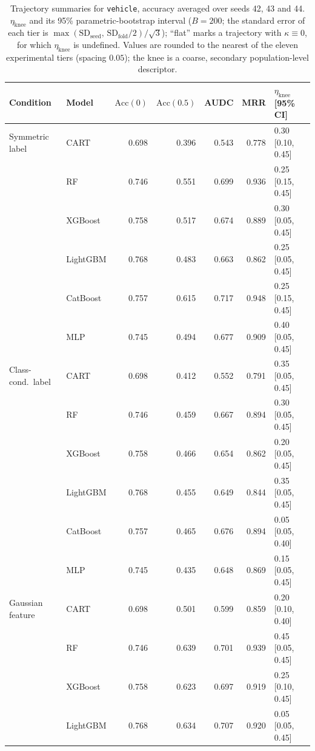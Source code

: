 \documentclass[pdflatex,sn-mathphys]{sn-jnl}
\theoremstyle{thmstyleone}
\begin{document}
\begin{table}[htbp]
\centering
\scriptsize
\setlength{\tabcolsep}{3.5pt}
\caption{Trajectory summaries for \texttt{vehicle}, accuracy averaged over seeds 42, 43 and 44. $\eta_{\mathrm{knee}}$ and its 95\% parametric-bootstrap interval ($B=200$; the standard error of each tier is $\max(\mathrm{SD}_{\mathrm{seed}},\,\mathrm{SD}_{\mathrm{fold}}/2)/\sqrt3$); ``flat'' marks a trajectory with $\kappa\equiv 0$, for which $\eta_{\mathrm{knee}}$ is undefined. Values are rounded to the nearest of the eleven experimental tiers (spacing $0.05$); the knee is a coarse, secondary population-level descriptor.}
\label{tab:traj_vehicle}
\begin{tabular}{@{}llrrrrl@{}}
\toprule
Condition & Model & $\mathrm{Acc}(0)$ & $\mathrm{Acc}(0.5)$ & AUDC & MRR & $\eta_{\mathrm{knee}}$ [95\% CI] \\
\midrule
Symmetric label & CART & 0.698 & 0.396 & 0.543 & 0.778 & 0.30 [0.10, 0.45] \\
 & RF & 0.746 & 0.551 & 0.699 & 0.936 & 0.25 [0.15, 0.45] \\
 & XGBoost & 0.758 & 0.517 & 0.674 & 0.889 & 0.30 [0.05, 0.45] \\
 & LightGBM & 0.768 & 0.483 & 0.663 & 0.862 & 0.25 [0.05, 0.45] \\
 & CatBoost & 0.757 & 0.615 & 0.717 & 0.948 & 0.25 [0.15, 0.45] \\
 & MLP & 0.745 & 0.494 & 0.677 & 0.909 & 0.40 [0.05, 0.45] \\
\midrule
Class-cond.\ label & CART & 0.698 & 0.412 & 0.552 & 0.791 & 0.35 [0.05, 0.45] \\
 & RF & 0.746 & 0.459 & 0.667 & 0.894 & 0.30 [0.05, 0.45] \\
 & XGBoost & 0.758 & 0.466 & 0.654 & 0.862 & 0.20 [0.05, 0.45] \\
 & LightGBM & 0.768 & 0.455 & 0.649 & 0.844 & 0.35 [0.05, 0.45] \\
 & CatBoost & 0.757 & 0.465 & 0.676 & 0.894 & 0.05 [0.05, 0.40] \\
 & MLP & 0.745 & 0.435 & 0.648 & 0.869 & 0.15 [0.05, 0.45] \\
\midrule
Gaussian feature & CART & 0.698 & 0.501 & 0.599 & 0.859 & 0.20 [0.10, 0.40] \\
 & RF & 0.746 & 0.639 & 0.701 & 0.939 & 0.45 [0.05, 0.45] \\
 & XGBoost & 0.758 & 0.623 & 0.697 & 0.919 & 0.25 [0.10, 0.45] \\
 & LightGBM & 0.768 & 0.634 & 0.707 & 0.920 & 0.05 [0.05, 0.45] \\

\end{tabular}
\end{table}
\end{document}
